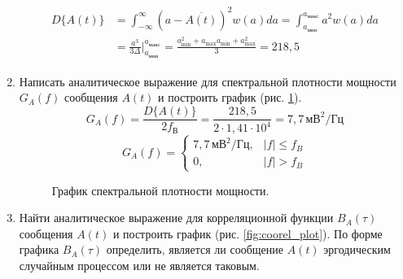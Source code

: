 \documentclass[a4paper, 12pt]{article}
\begin{document}
\begin{enumerate}
  \begin{align*}\begin{split}
    D\{A(t)\}&=\int^\infty_{-\infty}(a-\overline{A(t)})^2 w(a)da=
    \int^{a_{макс}}_{a_{мин}}a^2w(a)da\\
    &=\frac{a^3}{3\Delta}\Biggr|^{a_{макс}}_{a_{мин}}\!
    =\frac{a_\text{min}^2+a_\text{max}a_\text{min}+a_\text{max}^2}{3}
    =218,5
  \end{split}\end{align*}
  \item Написать аналитическое выражение для спектральной плотности
  мощности $G_A(f)$ сообщения $A(t)$ и построить график 
  (рис. \ref{fig:spectr_plot}).
  \[ G_A(f)=\frac{D\{A(t)\}}{2f_В}=\frac{218,5}{2\cdot1,41\cdot 10^4}
  =7,7 \,мВ^2/Гц \]
  \[ G_A(f)=\begin{cases}
    7,7 \,мВ^2/Гц, & |f| \leq f_B\\
    0, & |f| > f_B
  \end{cases} \]
  \begin{figure}[H]
    \centering
    \caption{График спектральной плотности мощности.}
    \label{fig:spectr_plot}
  \end{figure}
  \item Найти аналитическое выражение для корреляционной функции
  $B_A(\tau)$ сообщения $A(t)$ и построить график 
  (рис. \ref{fig:coorel_plot}). 
  По форме графика $B_A(\tau)$ определить, 
  является ли сообщение $A(t)$ эргодическим случайным процессом 
  или не является таковым.


\end{enumerate}
\end{document}
